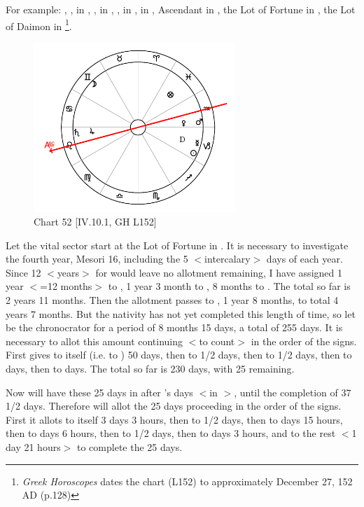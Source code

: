For example: \Sun, \Mercury, in \Capricorn, \Saturn, \Jupiter\xspace in \Leo, \Mars, \Venus\xspace in \Aquarius, \Moon\xspace in \Gemini, Ascendant in \Leo, the Lot of Fortune in \Pisces, the Lot of Daimon in \Capricorn
\footnote{\textit{Greek Horoscopes} dates the chart (L152) to approximately December 27, 152 AD (p.128)}. 

\clearpage
\begin{figure}
\centering
\vspace{-20pt}
\includegraphics[width=0.68\textwidth]{charts/4_10_1}
\caption{Chart 52 [IV.10.1, GH L152]}
\label{fig:chart52}
\end{figure} 

Let the vital sector start at the Lot of Fortune in \Pisces. It is necessary to investigate the fourth year, Mesori 16,
including the 5 $<$intercalary$>$ days of each year. Since 12 $<$years$>$ for \Pisces would leave no allotment remaining, I have assigned 1 year $<$=12 months$>$ to \Pisces, 1 year 3 month to \Aries, 8 months to \Taurus. The total so far is 2 years 11 months. Then the allotment passes to \Mercury, 1 year 8 months, to total 4 years 7 months. But the nativity has not yet completed this length of time, so let \Mercury\xspace be the chronocrator for a period of 8 months 15 days, a total of 255 days. It is necessary to allot this amount continuing $<$to count$>$ in the order of the signs. First \Mercury\xspace gives to itself (i.e. to \Gemini) 50 days, then to \Cancer\xspace 62 1/2 days, then to \Leo\xspace 47 1/2 days, then to \Virgo\xspace 50 days, then to  days. The total so far is 230 days, with 25 remaining. 

Now \Mars will have these 25 days in \Scorpio\xspace after \Venus's days $<$in \Libra$>$, until the completion of 37 1/2 days. Therefore \Mars\xspace will allot the 25 days proceeding in the order of the signs. First it allots to itself 3 days 3 hours, then to \Sagittarius\xspace 2 1/2 days, then to
\Capricorn\xspace 5 days 15 hours, then to \Aquarius\xspace 6 days 6 hours, then to \Pisces\xspace 2 1/2 days, then to \Aries\xspace 3 days 3 hours, and to \Taurus\xspace the rest $<$1 day 21 hours$>$ to complete the 25 days. 

